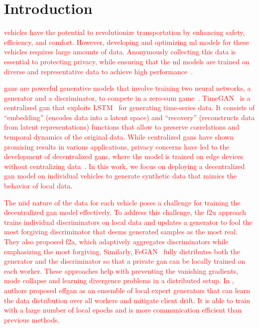 \section{Introduction}
\textcolor{red}{
 vehicles have the potential to revolutionize transportation by enhancing safety, efficiency, and comfort. However, developing and optimizing \gls*{ml} models for these vehicles requires large amounts of data. Anonymously collecting this data is essential to protecting privacy, while ensuring that the \gls*{ml} models are trained on diverse and representative data to achieve high performance~\cite{comm-efficient}.}

\textcolor{red}{
\glspl*{gan} are powerful generative models that involve training two neural networks, a generator and a discriminator, to compete in a zero-sum game~\cite{goodfellow_generative_2014}. TimeGAN~\cite{yoon_time-series_2019} is a centralized \gls*{gan} that exploits LSTM~\cite{hochreiter_long_1997} for generating time-series data. It consists of ``embedding'' (encodes data into a latent space) and ``recovery'' (reconstructs data from latent representations) functions that allow to preserve correlations and temporal dynamics of the original data. While centralized \glspl*{gan} have shown promising results in various applications, privacy concerns have led to the development of decentralized \glspl*{gan}, where the model is trained on edge devices without centralizing data~\cite{hardy_md-gan_2019}. In this work, we focus on deploying a decentralized \gls*{gan} model on individual vehicles to generate synthetic data that mimics the behavior of local data.}

\textcolor{red}{
The \gls*{niid} nature of the data for each vehicle poses a challenge for training the decentralized \gls*{gan} model effectively. To address this challenge, the \gls*{f2u} approach ~\cite{yonetani_decentralized_2019} trains individual discriminators on local data and updates a generator to fool the most forgiving discriminator that deems generated samples as the most real. They also proposed \gls*{f2a}, which adaptively aggregates discriminators while emphasizing the most forgiving. Similarly, FeGAN~\cite{guerraoui_fegan_2020} fully distributes both the generator and the discriminator so that a private \gls*{gan} can be locally trained on each worker. These approaches help with preventing the vanishing gradients, mode collapse and learning divergence problems in a distributed setup.}
\textcolor{red}{
In \cite{ekblom_effgan_2022}, %
authors proposed \gls*{effgan} as an ensemble of local expert generators that can learn the data distribution over all workers and mitigate client drift. It is able to train with a large number of local epochs and is more communication efficient than previous methods.}

